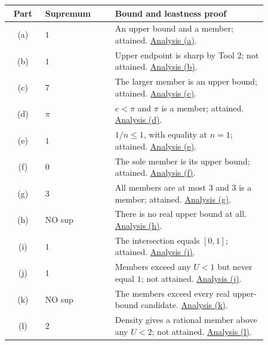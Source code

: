 \begin{center}
\begin{tabular}{@{}c@{\quad}p{0.27\linewidth}@{\quad}p{0.59\linewidth}@{}}
\toprule
Part&Supremum&Bound and leastness proof\\ \midrule
(a)&$1$&An upper bound and a member; attained. \hyperref[bounds:a]{Analysis (a)}.\\
(b)&$1$&Upper endpoint is sharp by Tool 2; not attained. \hyperref[bounds:b]{Analysis (b)}.\\
(c)&$7$&The larger member is an upper bound; attained. \hyperref[bounds:c]{Analysis (c)}.\\
(d)&$\pi$&$e<\pi$ and $\pi$ is a member; attained. \hyperref[bounds:d]{Analysis (d)}.\\
(e)&$1$&$1/n\leq1$, with equality at $n=1$; attained. \hyperref[bounds:e]{Analysis (e)}.\\
(f)&$0$&The sole member is its upper bound; attained. \hyperref[bounds:f]{Analysis (f)}.\\
(g)&$3$&All members are at most $3$ and $3$ is a member; attained. \hyperref[bounds:g]{Analysis (g)}.\\
(h)&NO sup&There is no real upper bound at all. \hyperref[bounds:h]{Analysis (h)}.\\
(i)&$1$&The intersection equals $[0,1]$; attained. \hyperref[bounds:i]{Analysis (i)}.\\
(j)&$1$&Members exceed any $U<1$ but never equal $1$; not attained. \hyperref[bounds:j]{Analysis (j)}.\\
(k)&NO sup&The members exceed every real upper-bound candidate. \hyperref[bounds:k]{Analysis (k)}.\\
(l)&$2$&Density gives a rational member above any $U<2$; not attained. \hyperref[bounds:l]{Analysis (l)}.\\
\bottomrule
\end{tabular}
\end{center}

